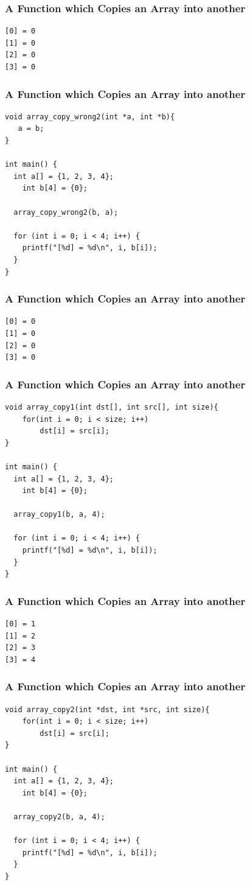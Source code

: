 \documentclass{../c-lecture}
\begin{document}
\begin{frame}[fragile]
  \frametitle{A Function which Copies an Array into another}
  \begin{verbatim}
[0] = 0
[1] = 0
[2] = 0
[3] = 0
  \end{verbatim}
\end{frame}

\begin{frame}[fragile]
  \frametitle{A Function which Copies an Array into another}
  \begin{verbatim}
void array_copy_wrong2(int *a, int *b){
   a = b;
}

int main() {
  int a[] = {1, 2, 3, 4};
	int b[4] = {0};

  array_copy_wrong2(b, a);

  for (int i = 0; i < 4; i++) {
    printf("[%d] = %d\n", i, b[i]);
  }
}
  \end{verbatim}
\end{frame}

\begin{frame}[fragile]
  \frametitle{A Function which Copies an Array into another}
  \begin{verbatim}
[0] = 0
[1] = 0
[2] = 0
[3] = 0
  \end{verbatim}
\end{frame}

\begin{frame}[fragile]
  \frametitle{A Function which Copies an Array into another}
  \begin{verbatim}
void array_copy1(int dst[], int src[], int size){
	for(int i = 0; i < size; i++)
		dst[i] = src[i];
}

int main() {
  int a[] = {1, 2, 3, 4};
	int b[4] = {0};

  array_copy1(b, a, 4);

  for (int i = 0; i < 4; i++) {
    printf("[%d] = %d\n", i, b[i]);
  }
}
  \end{verbatim}
\end{frame}

\begin{frame}[fragile]
  \frametitle{A Function which Copies an Array into another}
  \begin{verbatim}
[0] = 1
[1] = 2
[2] = 3
[3] = 4
  \end{verbatim}
\end{frame}

\begin{frame}[fragile]
  \frametitle{A Function which Copies an Array into another}
  \begin{verbatim}
void array_copy2(int *dst, int *src, int size){
	for(int i = 0; i < size; i++)
		dst[i] = src[i];
}

int main() {
  int a[] = {1, 2, 3, 4};
	int b[4] = {0};

  array_copy2(b, a, 4);

  for (int i = 0; i < 4; i++) {
    printf("[%d] = %d\n", i, b[i]);
  }
}
  \end{verbatim}
\end{frame}
\end{document}

